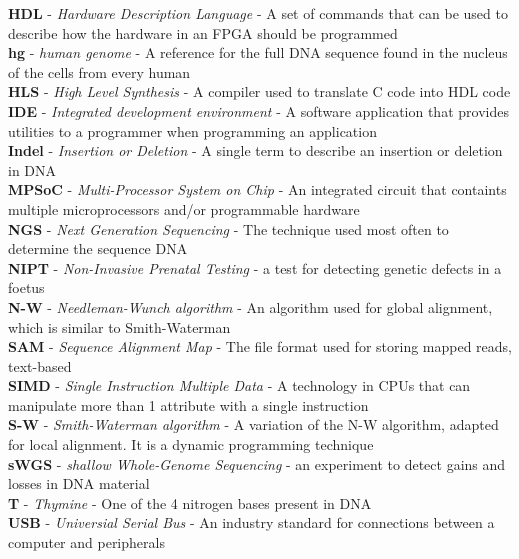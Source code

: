 \textbf{HDL} - \textit{Hardware Description Language} - A set of commands that can be used to describe how the hardware in an FPGA should be programmed \\
\textbf{hg} - \textit{human genome} - A reference for the full DNA sequence found in the nucleus of the cells from every human \\
\textbf{HLS} - \textit{High Level Synthesis} - A compiler used to translate C code into HDL code \\
\textbf{IDE} - \textit{Integrated development environment} - A software application that provides utilities to a programmer when programming an application \\
\textbf{Indel} - \textit{Insertion or Deletion} - A single term to describe an insertion or deletion in DNA \\
\textbf{MPSoC} - \textit{Multi-Processor System on Chip} - An integrated circuit that containts multiple microprocessors and/or programmable hardware \\
\textbf{NGS} - \textit{Next Generation Sequencing} - The technique used most often to determine the sequence DNA \\
\textbf{NIPT} - \textit{Non-Invasive Prenatal Testing} - a test for detecting genetic defects in a foetus \\
\textbf{N-W } - \textit{Needleman-Wunch algorithm} - An algorithm used for global alignment, which is similar to Smith-Waterman \\
\textbf{SAM} - \textit{Sequence Alignment Map} - The file format used for storing mapped reads, text-based \\
\textbf{SIMD} - \textit{Single Instruction Multiple Data} - A technology in CPUs that can manipulate more than 1 attribute with a single instruction \\
\textbf{S-W} - \textit{Smith-Waterman algorithm} - A variation of the N-W algorithm, adapted for local alignment. It is a dynamic programming technique \\
\textbf{sWGS} - \textit{shallow Whole-Genome Sequencing} - an experiment to detect gains and losses in DNA material \\
\textbf{T} - \textit{Thymine} - One of the 4 nitrogen bases present in DNA \\
\textbf{USB} - \textit{Universial Serial Bus} - An industry standard for connections between a computer and peripherals \\

